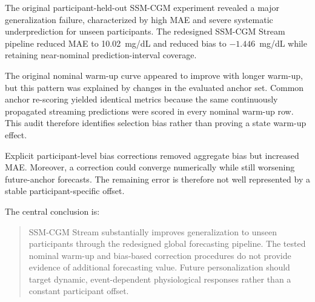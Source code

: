The original participant-held-out SSM-CGM experiment revealed a major
generalization failure, characterized by high MAE and severe systematic
underprediction for unseen participants. The redesigned SSM-CGM Stream
pipeline reduced MAE to 10.02~mg/dL and reduced bias to
$-1.446$~mg/dL while retaining near-nominal prediction-interval coverage.

The original nominal warm-up curve appeared to improve with longer warm-up,
but this pattern was explained by changes in the evaluated anchor set. Common
anchor re-scoring yielded identical metrics because the same continuously
propagated streaming predictions were scored in every nominal warm-up row.
This audit therefore identifies selection bias rather than proving a state
warm-up effect.

Explicit participant-level bias corrections removed aggregate bias but
increased MAE. Moreover, a correction could converge numerically while still
worsening future-anchor forecasts. The remaining error is therefore not well
represented by a stable participant-specific offset.

The central conclusion is:

\begin{quote}
SSM-CGM Stream substantially improves generalization to unseen participants
through the redesigned global forecasting pipeline. The tested nominal warm-up
and bias-based correction procedures do not provide evidence of additional
forecasting value. Future personalization should target dynamic,
event-dependent physiological responses rather than a constant participant
offset.
\end{quote}
